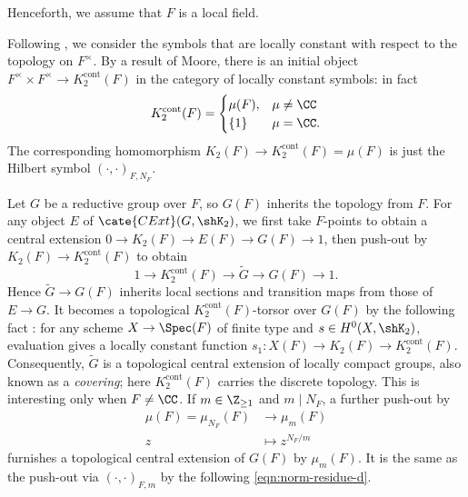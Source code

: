 \documentclass[a4paper,10pt]{article}
\begin{document}
Henceforth, we assume that $F$ is a local field.

Following \cite[10.1]{BD01}, we consider the symbols that are locally constant with respect to the topology on $F^\times$. By a result of Moore, there is an initial object $F^\times \times F^\times \to K_2^{\text{cont}}(F)$ in the category of locally constant symbols: in fact
\[ K_2^{\text{cont}}(F) = \begin{cases}
	\mu(F), & \mu \neq \CC \\
	\{1\} & \mu=\CC.
\end{cases} \]
The corresponding homomorphism $K_2(F) \to K_2^\text{cont}(F) = \mu(F)$ is just the Hilbert symbol $(\cdot,\cdot)_{F, N_F}$.

Let $G$ be a reductive group over $F$, so $G(F)$ inherits the topology from $F$. For any object $E$ of $\cate{CExt}(G, \shK_2)$, we first take $F$-points to obtain a central extension $0 \to K_2(F) \to E(F) \to G(F) \to 1$, then push-out by $K_2(F) \to K_2^\text{cont}(F)$ to obtain
\[ 1 \to K_2^\text{cont}(F) \to \tilde{G} \to G(F) \to 1. \]
Hence $\tilde{G} \to G(F)$ inherits local sections and transition maps from those of $E \to G$. It becomes a topological $K_2^\text{cont}(F)$-torsor over $G(F)$ by the following fact \cite[Lemma 10.2]{BD01}: for any scheme $X \to \Spec(F)$ of finite type and $s \in H^0(X, \shK_2)$, evaluation gives a locally constant function $s_1: X(F) \to K_2(F) \to K_2^\text{cont}(F)$. Consequently, $\tilde{G}$ is a topological central extension of locally compact groups, also known as a \emph{covering}; here $K_2^\text{cont}(F)$ carries the discrete topology. This is interesting only when $F \neq \CC$. If $m \in \Z_{\geq 1}$ and $m \mid N_F$, a further push-out by
\begin{equation*}\begin{aligned}
	\mu(F) = \mu_{N_F}(F) & \longrightarrow \mu_m(F) \\
	z & \longmapsto z^{N_F/m}
\end{aligned}\end{equation*}
furnishes a topological central extension of $G(F)$ by $\mu_m(F)$. It is the same as the push-out via $(\cdot, \cdot)_{F,m}$ by the following \eqref{eqn:norm-residue-d}.
\end{document}
